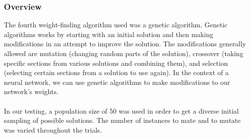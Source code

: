 \documentclass[h]{article}
\begin{document}
\subsubsection*{Overview}
The fourth weight-finding algorithm used was a genetic algorithm.  Genetic 
algorithms works by starting with an initial solution and then making 
modifications in an attempt to improve the solution.  The modifications 
generally allowed are mutation (changing random parts of the solution), crossover (taking specific sections
 from various solutions and combining them), and selection (selecting certain sections from a solution to use again). 
  In the context of a neural network, we can use genetic algorithms to make 
  modifications to our network's weights.
 \\ \\ 
 In our testing, a population size of 50 was used in order to get a diverse 
 initial sampling of possible solutions.  The number of instances to mate and to 
 mutate was varied throughout the trials.
 
\end{document}
